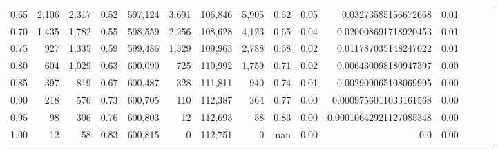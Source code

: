 \begin{tabular}{rrrrrrrrrrrrrrr}
0.65 &    2,106 &   2,317 &  0.52 &  597,124 &    3,691 &  106,846 &    5,905 &  0.62 &  0.05 &     0.03273585156672668 &      0.01 \\
0.70 &    1,435 &   1,782 &  0.55 &  598,559 &    2,256 &  108,628 &    4,123 &  0.65 &  0.04 &    0.020008691718920453 &      0.01 \\
0.75 &      927 &   1,335 &  0.59 &  599,486 &    1,329 &  109,963 &    2,788 &  0.68 &  0.02 &    0.011787035148247022 &      0.01 \\
0.80 &      604 &   1,029 &  0.63 &  600,090 &      725 &  110,992 &    1,759 &  0.71 &  0.02 &    0.006430098180947397 &      0.00 \\
0.85 &      397 &     819 &  0.67 &  600,487 &      328 &  111,811 &      940 &  0.74 &  0.01 &    0.002909065108069995 &      0.00 \\
0.90 &      218 &     576 &  0.73 &  600,705 &      110 &  112,387 &      364 &  0.77 &  0.00 &   0.0009756011033161568 &      0.00 \\
0.95 &       98 &     306 &  0.76 &  600,803 &       12 &  112,693 &       58 &  0.83 &  0.00 &  0.00010642921127085348 &      0.00 \\
1.00 &       12 &      58 &  0.83 &  600,815 &        0 &  112,751 &        0 &   nan &  0.00 &                     0.0 &      0.00 \\
\bottomrule
\end{tabular}
